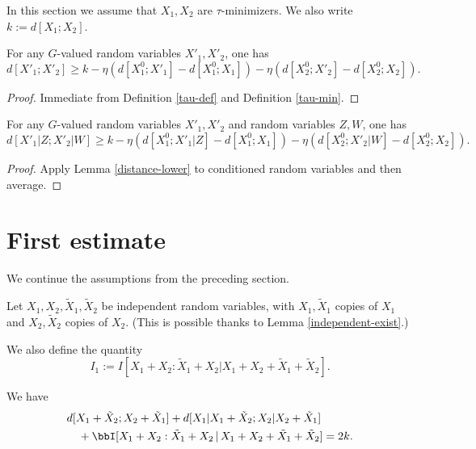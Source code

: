 In this section we assume that $X_1,X_2$ are $\tau$-minimizers. We also write $k := d[X_1;X_2]$.

\begin{lemma}\label{distance-lower}
  \leanok
  For any $G$-valued random variables $X'_1,X'_2$, one has
$$ d[X'_1;X'_2] \geq k - \eta (d[X^0_1;X'_1] - d[X^0_1;X_1] ) - \eta (d[X^0_2;X'_2] - d[X^0_2;X_2] ).$$
\end{lemma}

\begin{proof}
  \leanok
  Immediate from Definition \ref{tau-def} and Definition \ref{tau-min}.
\end{proof}

\begin{lemma}\label{cond-distance-lower}
  \leanok
  For any $G$-valued random variables $X'_1,X'_2$ and random variables $Z,W$, one has
$$ d[X'_1|Z;X'_2|W] \geq k - \eta (d[X^0_1;X'_1|Z] - d[X^0_1;X_1] ) - \eta (d[X^0_2;X'_2|W] - d[X^0_2;X_2] ).$$
\end{lemma}

\begin{proof}\leanok  Apply Lemma \ref{distance-lower} to conditioned random variables and then average.
\end{proof}

\section{First estimate}

We continue the assumptions from the preceding section.

Let $X_1, X_2, \tilde X_1, \tilde X_2$ be independent random variables, with $X_1,\tilde X_1$ copies of $X_1$ and $X_2,\tilde X_2$ copies of $X_2$.  (This is possible thanks to Lemma \ref{independent-exist}.)

We also define the quantity
$$ I_1 :=  I [X_1+X_2 : \tilde X_1 + X_2 | X_1+X_2+\tilde X_1+\tilde X_2].$$

\begin{lemma}\label{first-fibre}
  \leanok
  We have
  \begin{align*}
    &   d[X_1+\tilde X_2;X_2+\tilde X_1] + d[X_1|X_1+\tilde X_2; X_2|X_2+\tilde X_1] \\
    &\quad + \bbI[X_1+ X_2 : \tilde X_1 + X_2 \,|\, X_1 + X_2 + \tilde X_1 + \tilde X_2] = 2k.
  \end{align*}
\end{lemma}

